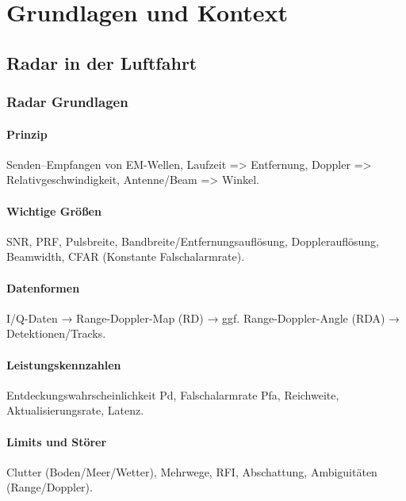 \part{Grundlagen und Kontext}
\chapter{Radar in der Luftfahrt}


\section{Radar Grundlagen}

\subsection{Prinzip}
Senden–Empfangen von EM-Wellen, 
Laufzeit => Entfernung, 
Doppler => Relativgeschwindigkeit, 
Antenne/Beam => Winkel.

\subsection{Wichtige Größen}
SNR, PRF, Pulsbreite, 
Bandbreite/Entfernungsauflösung, 
Dopplerauflösung, Beamwidth, 
CFAR (Konstante Falschalarmrate).

\subsection{Datenformen}
I/Q-Daten → Range-Doppler-Map (RD) → 
ggf. Range-Doppler-Angle (RDA) → Detektionen/Tracks.

\subsection{Leistungskennzahlen}
Entdeckungswahrscheinlichkeit Pd, Falschalarmrate Pfa, 
Reichweite, Aktualisierungsrate, Latenz.

\subsection{Limits und Störer}
Clutter (Boden/Meer/Wetter), Mehrwege, RFI, 
Abschattung, Ambiguitäten (Range/Doppler).



